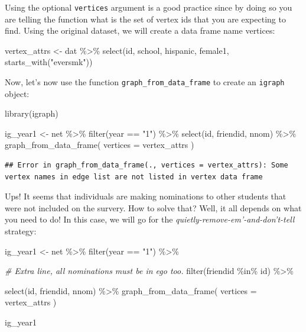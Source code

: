 \documentclass[
]{book}
\newenvironment{Shaded}{\begin{snugshade}}{\end{snugshade}}
\newcommand{\AttributeTok}[1]{\textcolor[rgb]{0.77,0.63,0.00}{#1}}
\newcommand{\CommentTok}[1]{\textcolor[rgb]{0.56,0.35,0.01}{\textit{#1}}}
\newcommand{\FunctionTok}[1]{\textcolor[rgb]{0.00,0.00,0.00}{#1}}
\newcommand{\NormalTok}[1]{#1}
\newcommand{\OtherTok}[1]{\textcolor[rgb]{0.56,0.35,0.01}{#1}}
\newcommand{\SpecialCharTok}[1]{\textcolor[rgb]{0.00,0.00,0.00}{#1}}
\newcommand{\StringTok}[1]{\textcolor[rgb]{0.31,0.60,0.02}{#1}}
\begin{document}
Using the optional \texttt{vertices} argument is a good practice since by doing so you are telling the function what is the set of vertex ids that you are expecting to find. Using the original dataset, we will create a data frame name vertices:

\begin{Shaded}
\begin{Highlighting}[]
\NormalTok{vertex\_attrs }\OtherTok{\textless{}{-}}\NormalTok{ dat }\SpecialCharTok{\%\textgreater{}\%} 
  \FunctionTok{select}\NormalTok{(id, school, hispanic, female1, }\FunctionTok{starts\_with}\NormalTok{(}\StringTok{"eversmk"}\NormalTok{))}
\end{Highlighting}
\end{Shaded}

Now, let's now use the function \texttt{graph\_from\_data\_frame} to create an \texttt{igraph} object:

\begin{Shaded}
\begin{Highlighting}[]
\FunctionTok{library}\NormalTok{(igraph)}

\NormalTok{ig\_year1 }\OtherTok{\textless{}{-}}\NormalTok{ net }\SpecialCharTok{\%\textgreater{}\%}
  \FunctionTok{filter}\NormalTok{(year }\SpecialCharTok{==} \StringTok{"1"}\NormalTok{) }\SpecialCharTok{\%\textgreater{}\%} 
  \FunctionTok{select}\NormalTok{(id, friendid, nnom) }\SpecialCharTok{\%\textgreater{}\%}
  \FunctionTok{graph\_from\_data\_frame}\NormalTok{(}
    \AttributeTok{vertices =}\NormalTok{ vertex\_attrs}
\NormalTok{  )}
\end{Highlighting}
\end{Shaded}

\begin{verbatim}
## Error in graph_from_data_frame(., vertices = vertex_attrs): Some vertex names in edge list are not listed in vertex data frame
\end{verbatim}

Ups! It seems that individuals are making nominations to other students that were not included on the survery. How to solve that? Well, it all depends on what you need to do! In this case, we will go for the \emph{quietly-remove-em'-and-don't-tell} strategy:

\begin{Shaded}
\begin{Highlighting}[]
\NormalTok{ig\_year1 }\OtherTok{\textless{}{-}}\NormalTok{ net }\SpecialCharTok{\%\textgreater{}\%}
  \FunctionTok{filter}\NormalTok{(year }\SpecialCharTok{==} \StringTok{"1"}\NormalTok{) }\SpecialCharTok{\%\textgreater{}\%}
  
  \CommentTok{\# Extra line, all nominations must be in ego too.}
  \FunctionTok{filter}\NormalTok{(friendid }\SpecialCharTok{\%in\%}\NormalTok{ id) }\SpecialCharTok{\%\textgreater{}\%} 
  
  \FunctionTok{select}\NormalTok{(id, friendid, nnom) }\SpecialCharTok{\%\textgreater{}\%}
  \FunctionTok{graph\_from\_data\_frame}\NormalTok{(}
    \AttributeTok{vertices =}\NormalTok{ vertex\_attrs}
\NormalTok{    )}

\NormalTok{ig\_year1}
\end{Highlighting}
\end{Shaded}
\end{document}
